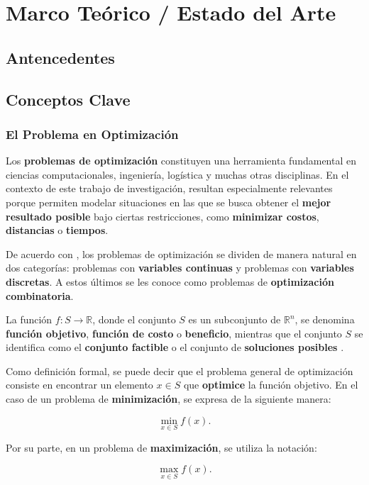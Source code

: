 \documentclass[12pt,titlepage,twoside,openright]{book}
\begin{document}
\chapter{Marco Teórico / Estado del Arte}
\label{cap:marco-teorico}
\section{Antencedentes}
\section{Conceptos Clave}
\subsection{El Problema en Optimización}

Los \textbf{problemas de optimización} constituyen una herramienta fundamental en ciencias computacionales, ingeniería, logística y muchas otras disciplinas. En el contexto de este trabajo de investigación, resultan especialmente relevantes porque permiten modelar situaciones en las que se busca obtener el \textbf{mejor resultado posible} bajo ciertas restricciones, como \textbf{minimizar costos}, \textbf{distancias} o \textbf{tiempos}.

De acuerdo con \citep{cobos2010}, los problemas de optimización se dividen de manera natural en dos categorías: problemas con \textbf{variables continuas} y problemas con \textbf{variables discretas}. A estos últimos se les conoce como problemas de \textbf{optimización combinatoria}.

La función \(f : S \to \mathbb{R}\), donde el conjunto \(S\) es un subconjunto de \(\mathbb{R}^n\), se denomina \textbf{función objetivo}, \textbf{función de costo} o \textbf{beneficio}, mientras que el conjunto \(S\) se identifica como el \textbf{conjunto factible} o el conjunto de \textbf{soluciones posibles} \citep{cobos2010}.

Como definición formal, se puede decir que el problema general de optimización consiste en encontrar un elemento \(x \in S\) que \textbf{optimice} la función objetivo. En el caso de un problema de \textbf{minimización}, se expresa de la siguiente manera:

\[
	\min_{x \in S} f(x).
\]

Por su parte, en un problema de \textbf{maximización}, se utiliza la notación:

\[
	\max_{x \in S} f(x).
\]

\citep{cobos2010}
\end{document}
